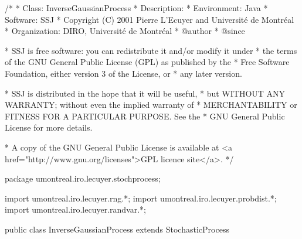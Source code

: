 \begin{code}
\begin{hide}
/*
 * Class:        InverseGaussianProcess
 * Description:  
 * Environment:  Java
 * Software:     SSJ 
 * Copyright (C) 2001  Pierre L'Ecuyer and Université de Montréal
 * Organization: DIRO, Université de Montréal
 * @author       
 * @since

 * SSJ is free software: you can redistribute it and/or modify it under
 * the terms of the GNU General Public License (GPL) as published by the
 * Free Software Foundation, either version 3 of the License, or
 * any later version.

 * SSJ is distributed in the hope that it will be useful,
 * but WITHOUT ANY WARRANTY; without even the implied warranty of
 * MERCHANTABILITY or FITNESS FOR A PARTICULAR PURPOSE.  See the
 * GNU General Public License for more details.

 * A copy of the GNU General Public License is available at
   <a href="http://www.gnu.org/licenses">GPL licence site</a>.
 */
\end{hide}
package umontreal.iro.lecuyer.stochprocess;\begin{hide}
import umontreal.iro.lecuyer.rng.*;
import umontreal.iro.lecuyer.probdist.*;
import umontreal.iro.lecuyer.randvar.*;

\end{hide}

public class InverseGaussianProcess extends StochasticProcess \begin{hide} {

    protected RandomStream       stream;

    protected double   delta;
    protected double   gamma;

    protected double   deltaOverGamma;
    protected double   deltaSquare;
    // mu and lambda are the common names of the params for InverseGaussianGen.
    protected double[] imu;
    protected double[] ilam;

    // Number of random streams needed by the current class
    // to generate an IG process.  For this class, = 1, for subclasses
    // will sometimes be, = 2.
    int numberOfRandomStreams;

\end{hide}
\end{code}
